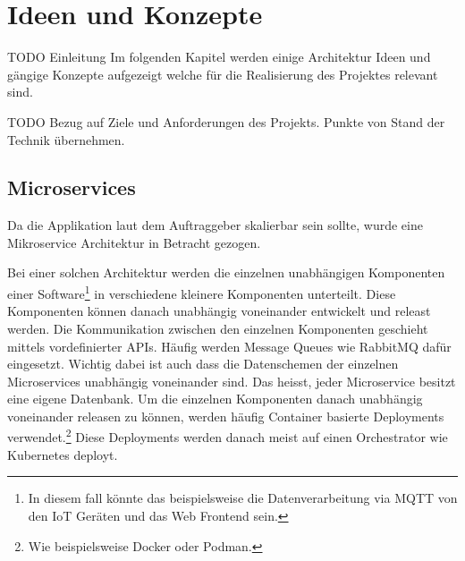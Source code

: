 \chapter{Ideen und Konzepte}



TODO Einleitung
Im folgenden Kapitel werden einige Architektur Ideen und gängige Konzepte
aufgezeigt welche für die Realisierung des Projektes relevant sind.

TODO Bezug auf Ziele und Anforderungen des Projekts. Punkte von Stand der Technik übernehmen.

\section{Microservices}

Da die Applikation laut dem Auftraggeber skalierbar sein sollte, wurde
eine Mikroservice Architektur in Betracht gezogen.

Bei einer solchen Architektur werden die einzelnen unabhängigen Komponenten
einer Software\footnote{
    In diesem fall könnte das beispielsweise die Datenverarbeitung via MQTT
    von den \ac{IoT} Geräten und das Web Frontend sein.
} in verschiedene kleinere Komponenten unterteilt.
Diese Komponenten können danach unabhängig voneinander entwickelt und
releast werden.
Die Kommunikation zwischen den einzelnen Komponenten geschieht mittels
vordefinierter \ac{API}s. Häufig werden Message Queues wie RabbitMQ dafür
eingesetzt. Wichtig dabei ist auch dass die Datenschemen der einzelnen
Microservices unabhängig voneinander sind. Das heisst, jeder Microservice
besitzt eine eigene Datenbank. \cite{microservices}
Um die einzelnen Komponenten danach unabhängig voneinander releasen zu
können, werden häufig Container basierte Deployments verwendet.\footnote{
    Wie beispielsweise Docker oder Podman.
}
Diese Deployments werden danach meist auf einen Orchestrator wie Kubernetes
deployt.

